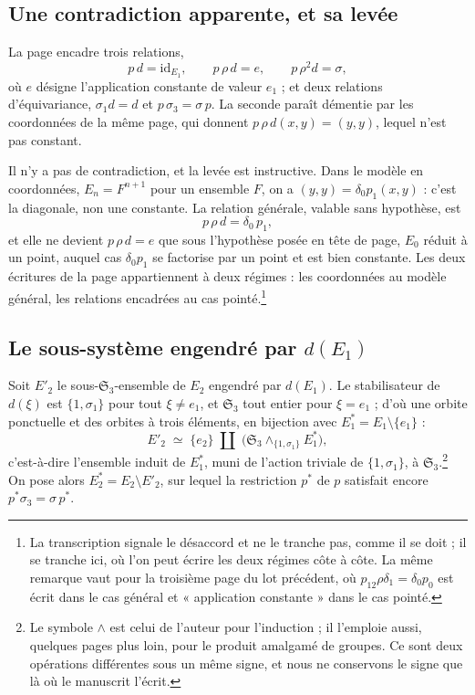 \documentclass[11pt,a4paper]{article}
\begin{document}
\subsection*{Une contradiction apparente, et sa levée}

La page encadre trois relations,
\[
  p\,d = \mathrm{id}_{E_{1}}, \qquad p\,\rho\,d = e, \qquad
  p\,\rho^{2}d = \sigma,
\]
où $e$ désigne l'application constante de valeur $e_{1}$ ; et deux relations
d'équivariance, $\sigma_{1}d = d$ et $p\,\sigma_{3} = \sigma\,p$. La seconde
paraît démentie par les coordonnées de la même page, qui donnent
$p\,\rho\,d(x,y) = (y,y)$, lequel n'est pas constant.

Il n'y a pas de contradiction, et la levée est instructive. Dans le modèle en
coordonnées, $E_{n} = F^{n+1}$ pour un ensemble $F$, on a $(y,y) =
\delta_{0}p_{1}(x,y)$ : c'est la diagonale, non une constante. La relation
générale, valable sans hypothèse, est
\[
  p\,\rho\,d = \delta_{0}\,p_{1},
\]
et elle ne devient $p\,\rho\,d = e$ que sous l'hypothèse posée en tête de page,
$E_{0}$ réduit à un point, auquel cas $\delta_{0}p_{1}$ se factorise par un
point et est bien constante. Les deux écritures de la page appartiennent à deux
régimes : les coordonnées au modèle général, les relations encadrées au cas
pointé.\footnote{La transcription signale le désaccord et ne le tranche pas,
comme il se doit ; il se tranche ici, où l'on peut écrire les deux régimes
côte à côte. La même remarque vaut pour la troisième page du lot
précédent, où $p_{12}\rho\delta_{1} = \delta_{0}p_{0}$ est écrit dans le cas
général et « application constante » dans le cas pointé.}

\subsection*{Le sous-système engendré par $d(E_{1})$}

Soit $E'_{2}$ le sous-$\mathfrak{S}_{3}$-ensemble de $E_{2}$ engendré par
$d(E_{1})$. Le stabilisateur de $d(\xi)$ est $\{1,\sigma_{1}\}$ pour tout
$\xi \neq e_{1}$, et $\mathfrak{S}_{3}$ tout entier pour $\xi = e_{1}$ ; d'où
une orbite ponctuelle et des orbites à trois éléments, en bijection avec
$E^{*}_{1} = E_{1} \setminus \{e_{1}\}$ :
\[
  E'_{2} \;\simeq\; \{e_{2}\} \;\amalg\;
  \bigl(\mathfrak{S}_{3} \wedge_{\{1,\sigma_{1}\}} E^{*}_{1}\bigr),
\]
c'est-à-dire l'ensemble induit de $E^{*}_{1}$, muni de l'action triviale de
$\{1,\sigma_{1}\}$, à $\mathfrak{S}_{3}$.\footnote{Le symbole $\wedge$ est celui
de l'auteur pour l'induction ; il l'emploie aussi, quelques pages plus loin, pour
le produit amalgamé de groupes. Ce sont deux opérations différentes sous un même
signe, et nous ne conservons le signe que là où le manuscrit l'écrit.} On pose
alors $E^{*}_{2} = E_{2} \setminus E'_{2}$, sur lequel la restriction
$p^{*}$ de $p$ satisfait encore $p^{*}\sigma_{3} = \sigma\,p^{*}$.
\end{document}
